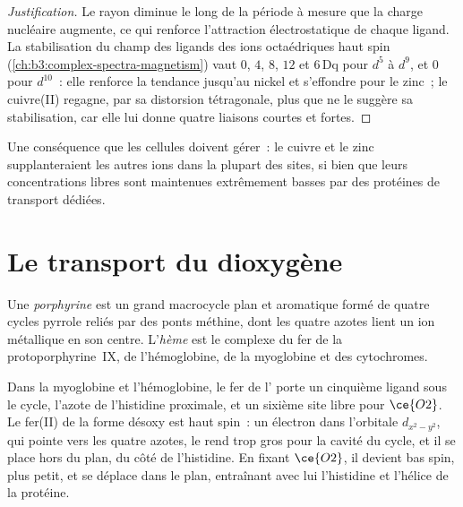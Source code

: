 \begin{proof}[Justification]
Le rayon diminue le long de la période à mesure que la charge nucléaire
augmente, ce qui renforce l'attraction électrostatique de chaque ligand. La
stabilisation du champ des ligands des ions octaédriques haut spin
(\cref{ch:b3:complex-spectra-magnetism}) vaut $0$, $4$,
$8$, $12$ et $6\,\mathrm{Dq}$ pour $d^5$ à $d^9$, et $0$ pour $d^{10}$~: elle renforce la tendance jusqu'au nickel et
s'effondre pour le zinc~; le cuivre(II) regagne, par sa distorsion
tétragonale, plus que ne le suggère sa stabilisation, car elle lui donne
quatre liaisons courtes et fortes.
\end{proof}

Une conséquence que les cellules doivent gérer~: le cuivre et le zinc
supplanteraient les autres ions dans la plupart des sites, si bien que
leurs concentrations libres sont maintenues extrêmement basses par des
protéines de transport dédiées.

\section{Le transport du dioxygène}

\begin{definition}\label{def:b3:bioinorganic:haem}
Une \emph{porphyrine} est un grand macrocycle plan et
aromatique formé de quatre cycles pyrrole reliés par des ponts méthine, dont
les quatre azotes lient un ion métallique en son centre. L'\emph{hème}
est le complexe du fer de la protoporphyrine~IX,  de l'hémoglobine,
de la myoglobine et des cytochromes.
\end{definition}

Dans la myoglobine et l'hémoglobine, le fer de l' porte un cinquième
ligand sous le cycle, l'azote de l'histidine proximale, et un sixième site
libre pour $\ce{O2}$. Le fer(II) de la forme désoxy est haut spin~: un électron dans l'orbitale $d_{x^2-y^2}$, qui pointe vers les quatre
azotes, le rend trop gros pour la cavité du cycle, et il se place hors du
plan, du côté de l'histidine. En fixant $\ce{O2}$, il devient bas spin, plus petit, et
se déplace dans le plan, entraînant avec lui l'histidine et l'hélice de la
protéine.

